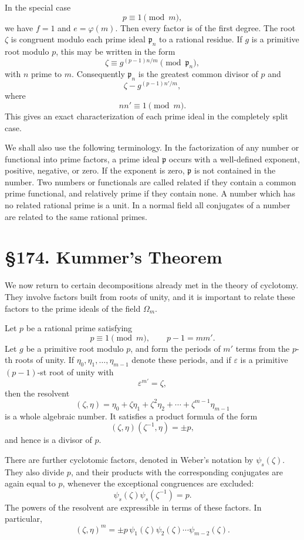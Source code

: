 \documentclass[12pt,a4paper]{article}
\newcommand{\webersection}[2]{\clearpage\section*{\S #1. #2}}
\newcommand{\p}{\mathfrak p}
\begin{document}
In the special case
\[
  p\equiv1\pmod m,
\tag{8}
\]
we have \(f=1\) and \(e=\varphi(m)\).  Then every factor is of the first degree.  The root \(\zeta\) is congruent modulo each prime ideal \(\p_n\) to a rational residue.  If \(g\) is a primitive root modulo \(p\), this may be written in the form
\[
  \zeta\equiv g^{(p-1)n/m}\pmod{\p_n},
\tag{9}
\]
with \(n\) prime to \(m\).  Consequently \(\p_n\) is the greatest common divisor of \(p\) and
\[
  \zeta-g^{(p-1)n'/m},
\tag{10}
\]
where
\[
  nn'\equiv1\pmod m.
\tag{11}
\]
This gives an exact characterization of each prime ideal in the completely split case.

We shall also use the following terminology.  In the factorization of any number or functional into prime factors, a prime ideal \(\p\) occurs with a well-defined exponent, positive, negative, or zero.  If the exponent is zero, \(\p\) is not contained in the number.  Two numbers or functionals are called related if they contain a common prime functional, and relatively prime if they contain none.  A number which has no related rational prime is a unit.  In a normal field all conjugates of a number are related to the same rational primes.

\webersection{174}{Kummer's Theorem}

We now return to certain decompositions already met in the theory of cyclotomy.  They involve factors built from roots of unity, and it is important to relate these factors to the prime ideals of the field \(\Omega_m\).

Let \(p\) be a rational prime satisfying
\[
  p\equiv1\pmod m,\qquad p-1=mm'.
\tag{1}
\]
Let \(g\) be a primitive root modulo \(p\), and form the periods of \(m'\) terms from the \(p\)-th roots of unity.  If \(\eta_0,\eta_1,\ldots,\eta_{m-1}\) denote these periods, and if \(\varepsilon\) is a primitive \((p-1)\)-st root of unity with
\[
  \varepsilon^{m'}=\zeta,
\tag{2}
\]
then the resolvent
\[
  (\zeta,\eta)=\eta_0+\zeta\eta_1+\zeta^2\eta_2+\cdots+\zeta^{m-1}\eta_{m-1}
\tag{3}
\]
is a whole algebraic number.  It satisfies a product formula of the form
\[
  (\zeta,\eta)(\zeta^{-1},\eta)=\pm p,
\tag{4}
\]
and hence is a divisor of \(p\).

There are further cyclotomic factors, denoted in Weber's notation by \(\psi_s(\zeta)\).  They also divide \(p\), and their products with the corresponding conjugates are again equal to \(p\), whenever the exceptional congruences are excluded:
\[
  \psi_s(\zeta)\psi_s(\zeta^{-1})=p.
\tag{5}
\]
The powers of the resolvent are expressible in terms of these factors.  In particular,
\[
  (\zeta,\eta)^m
       =\pm p\,\psi_1(\zeta)\psi_2(\zeta)\cdots\psi_{m-2}(\zeta).
\tag{6}
\]
\end{document}
